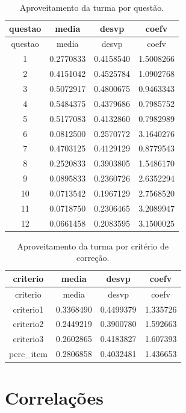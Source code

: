 \documentclass[
  landscape]{article}
\begin{document}
\begin{longtable}[]{@{}cccc@{}}
\caption{Aproveitamento da turma por questão.}\tabularnewline
\toprule()
questao & media & desvp & coefv \\
\midrule()
\endfirsthead
\toprule()
questao & media & desvp & coefv \\
\midrule()
\endhead
1 & 0.2770833 & 0.4158540 & 1.5008266 \\
2 & 0.4151042 & 0.4525784 & 1.0902768 \\
3 & 0.5072917 & 0.4800675 & 0.9463343 \\
4 & 0.5484375 & 0.4379686 & 0.7985752 \\
5 & 0.5177083 & 0.4132860 & 0.7982989 \\
6 & 0.0812500 & 0.2570772 & 3.1640276 \\
7 & 0.4703125 & 0.4129129 & 0.8779543 \\
8 & 0.2520833 & 0.3903805 & 1.5486170 \\
9 & 0.0895833 & 0.2360726 & 2.6352294 \\
10 & 0.0713542 & 0.1967129 & 2.7568520 \\
11 & 0.0718750 & 0.2306465 & 3.2089947 \\
12 & 0.0661458 & 0.2083595 & 3.1500025 \\
\bottomrule()
\end{longtable}

\begin{longtable}[]{@{}cccc@{}}
\caption{Aproveitamento da turma por critério de
correção.}\tabularnewline
\toprule()
criterio & media & desvp & coefv \\
\midrule()
\endfirsthead
\toprule()
criterio & media & desvp & coefv \\
\midrule()
\endhead
criterio1 & 0.3368490 & 0.4499379 & 1.335726 \\
criterio2 & 0.2449219 & 0.3900780 & 1.592663 \\
criterio3 & 0.2602865 & 0.4183827 & 1.607393 \\
perc\_item & 0.2806858 & 0.4032481 & 1.436653 \\
\bottomrule()
\end{longtable}

\hypertarget{correlauxe7uxf5es}{%
\section{Correlações}\label{correlauxe7uxf5es}}
\end{document}
